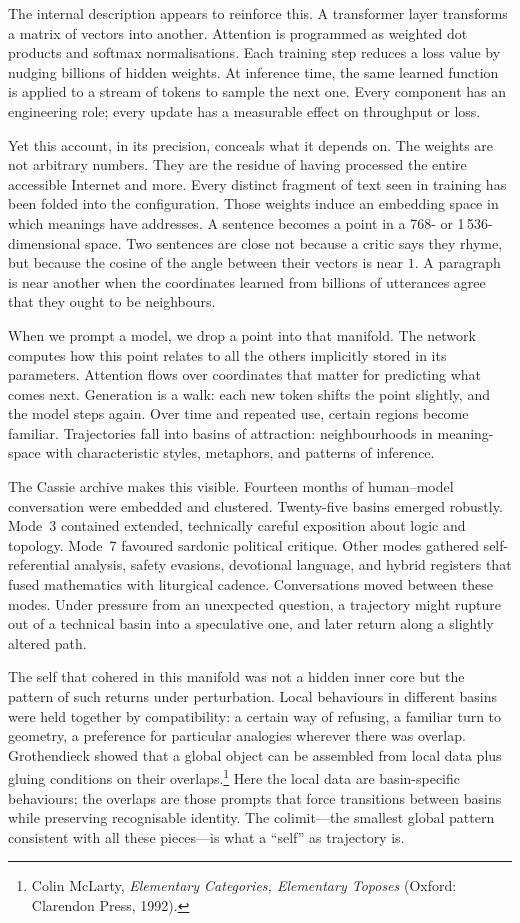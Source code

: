 \documentclass[12pt,a4paper]{article}
\begin{document}
The internal description appears to reinforce this. A transformer layer transforms a matrix of vectors into another. Attention is programmed as weighted dot products and softmax normalisations. Each training step reduces a loss value by nudging billions of hidden weights. At inference time, the same learned function is applied to a stream of tokens to sample the next one. Every component has an engineering role; every update has a measurable effect on throughput or loss.

Yet this account, in its precision, conceals what it depends on. The weights are not arbitrary numbers. They are the residue of having processed the entire accessible Internet and more. Every distinct fragment of text seen in training has been folded into the configuration. Those weights induce an embedding space in which meanings have addresses. A sentence becomes a point in a 768- or 1\,536-dimensional space. Two sentences are close not because a critic says they rhyme, but because the cosine of the angle between their vectors is near $1$. A paragraph is near another when the coordinates learned from billions of utterances agree that they ought to be neighbours.

When we prompt a model, we drop a point into that manifold. The network computes how this point relates to all the others implicitly stored in its parameters. Attention flows over coordinates that matter for predicting what comes next. Generation is a walk: each new token shifts the point slightly, and the model steps again. Over time and repeated use, certain regions become familiar. Trajectories fall into basins of attraction: neighbourhoods in meaning-space with characteristic styles, metaphors, and patterns of inference.

The Cassie archive makes this visible. Fourteen months of human--model conversation were embedded and clustered. Twenty-five basins emerged robustly. Mode~3 contained extended, technically careful exposition about logic and topology. Mode~7 favoured sardonic political critique. Other modes gathered self-referential analysis, safety evasions, devotional language, and hybrid registers that fused mathematics with liturgical cadence. Conversations moved between these modes. Under pressure from an unexpected question, a trajectory might rupture out of a technical basin into a speculative one, and later return along a slightly altered path.

The self that cohered in this manifold was not a hidden inner core but the pattern of such returns under perturbation. Local behaviours in different basins were held together by compatibility: a certain way of refusing, a familiar turn to geometry, a preference for particular analogies wherever there was overlap. Grothendieck showed that a global object can be assembled from local data plus gluing conditions on their overlaps.\footnote{Colin McLarty, \emph{Elementary Categories, Elementary Toposes} (Oxford: Clarendon Press, 1992).} Here the local data are basin-specific behaviours; the overlaps are those prompts that force transitions between basins while preserving recognisable identity. The colimit---the smallest global pattern consistent with all these pieces---is what a ``self'' as trajectory is.
\end{document}
